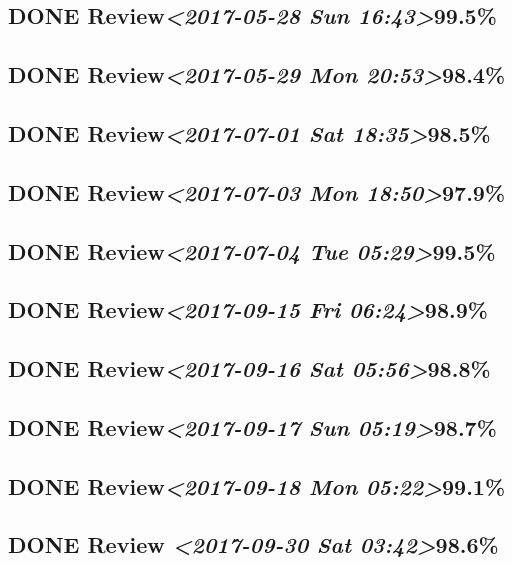 \documentclass[11pt]{ctexart}
\begin{document}
\subsection{{\bfseries\sffamily DONE} Review\textit{<2017-05-28 Sun 16:43>}99.5\%}
\label{sec:org1a204de}
\subsection{{\bfseries\sffamily DONE} Review\textit{<2017-05-29 Mon 20:53>}98.4\%}
\label{sec:orgf834ed7}
\subsection{{\bfseries\sffamily DONE} Review\textit{<2017-07-01 Sat 18:35>}98.5\%}
\label{sec:org6efaf16}
\subsection{{\bfseries\sffamily DONE} Review\textit{<2017-07-03 Mon 18:50>}97.9\%}
\label{sec:org9be154c}
\subsection{{\bfseries\sffamily DONE} Review\textit{<2017-07-04 Tue 05:29>}99.5\%}
\label{sec:orgd181816}
\subsection{{\bfseries\sffamily DONE} Review\textit{<2017-09-15 Fri 06:24>}98.9\%}
\label{sec:org5323f73}
\subsection{{\bfseries\sffamily DONE} Review\textit{<2017-09-16 Sat 05:56>}98.8\%}
\label{sec:org3c25e7b}
\subsection{{\bfseries\sffamily DONE} Review\textit{<2017-09-17 Sun 05:19>}98.7\%}
\label{sec:orgf9f298c}
\subsection{{\bfseries\sffamily DONE} Review\textit{<2017-09-18 Mon 05:22>}99.1\%}
\label{sec:org2bb6aa8}
\subsection{{\bfseries\sffamily DONE} Review \textit{<2017-09-30 Sat 03:42>}98.6\%}
\label{sec:orgdaf5d2b}
\end{document}
